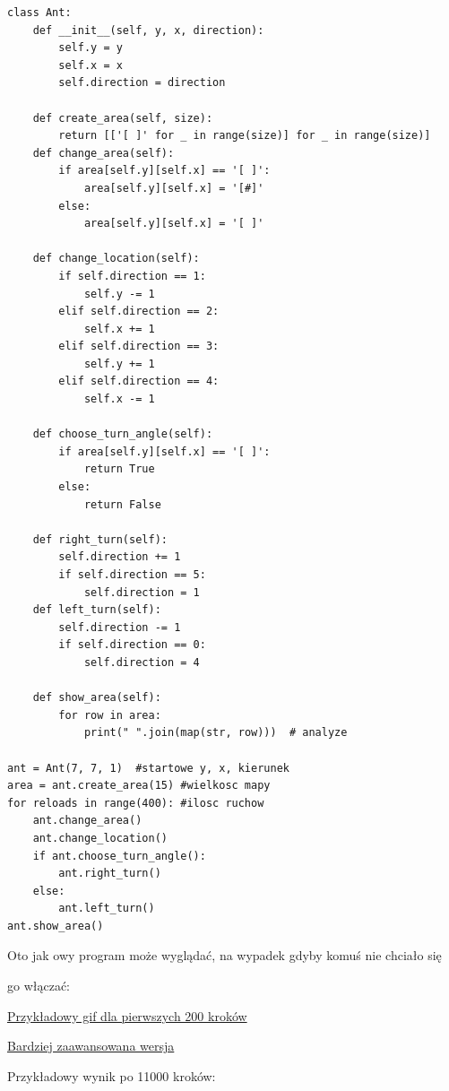 \documentclass[a4paper, 12pt]{article}
\begin{document}
\noindent\begin{minipage}{\linewidth}
\begin{lstlisting}[style=python]
class Ant:
    def __init__(self, y, x, direction):
        self.y = y
        self.x = x
        self.direction = direction
        
    def create_area(self, size):
        return [['[ ]' for _ in range(size)] for _ in range(size)]
    def change_area(self):
        if area[self.y][self.x] == '[ ]':
            area[self.y][self.x] = '[#]' 
        else:
            area[self.y][self.x] = '[ ]'
            
    def change_location(self):
        if self.direction == 1:
            self.y -= 1
        elif self.direction == 2:
            self.x += 1
        elif self.direction == 3:
            self.y += 1
        elif self.direction == 4:
            self.x -= 1

    def choose_turn_angle(self):
        if area[self.y][self.x] == '[ ]':
            return True
        else:
            return False

    def right_turn(self):
        self.direction += 1
        if self.direction == 5:
            self.direction = 1
    def left_turn(self):
        self.direction -= 1
        if self.direction == 0:
            self.direction = 4

    def show_area(self):
        for row in area:
            print(" ".join(map(str, row)))  # analyze

ant = Ant(7, 7, 1)  #startowe y, x, kierunek
area = ant.create_area(15) #wielkosc mapy
for reloads in range(400): #ilosc ruchow
    ant.change_area()
    ant.change_location()
    if ant.choose_turn_angle():
        ant.right_turn()
    else:
        ant.left_turn()
ant.show_area()

\end{lstlisting}
\end{minipage}


\pagebreak
Oto jak owy program może wyglądać, na wypadek gdyby komuś nie chciało się 

go włączać: 


\href{https://upload.wikimedia.org/wikipedia/commons/0/09/LangtonsAntAnimated.gif}{Przykładowy gif dla pierwszych 200 kroków}


\href{https://upload.wikimedia.org/wikipedia/commons/a/a3/MulticolorLangtonsAnt.gif}{Bardziej zaawansowana wersja}
\newline

Przykładowy wynik po 11000 kroków\cite{ant}:
\end{document}

